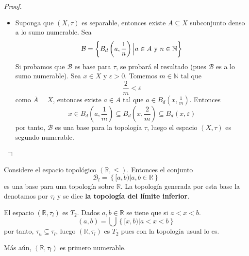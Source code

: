 \documentclass[12pt]{report}
\newcounter{it}
\theoremstyle{largebreak}
\begin{document}
\begin{proof}
\begin{itemize}
            \item Suponga que $(X,\tau)$ es separable, entonces existe $A\subseteq X$ subconjunto denso a lo sumo numerable. Sea
            \begin{equation*}
                \mathcal{B}=\left\{B_d\left(a,\frac{1}{n}\right) \Big|a\in A\textup{ y }n\in\mathbb{N} \right\}
            \end{equation*}
            Si probamos que $\mathcal{B}$ es base para $\tau$, se probará el resultado (pues $\mathcal{B}$ es a lo sumo numerable). Sea $x\in X$ y $\varepsilon>0$. Tomemos $m\in\mathbb{N}$ tal que
            \begin{equation*}
                \frac{2}{m}<\varepsilon
            \end{equation*}
            como $\overline{A}=X$, entonces existe $a\in A$ tal que $a\in B_d\left(x,\frac{1}{m}\right)$. Entonces
            \begin{equation*}
                x\in B_d\left(a,\frac{1}{m}\right)\subseteq B_d\left(x,\frac{2}{m} \right)\subseteq B_d\left(x,\varepsilon\right)
            \end{equation*}
            por tanto, $\mathcal{B}$ es una base para la topología $\tau$, luego el espacio $(X,\tau)$ es segundo numerable.
        \end{itemize}
    \end{proof}

    \begin{exa}
        Considere el espacio topológico $(\mathbb{R},\leq)$. Entonces el conjunto
        \begin{equation*}
            \mathcal{B}_l=\left\{[a,b)\Big|a,b\in\mathbb{R} \right\}
        \end{equation*}
        es una base para una topología sobre $\mathbb{R}$. La topología generada por esta base la denotamos por $\tau_l$ y se dice \textbf{la topología del límite inferior}.
    \end{exa}

    \begin{exa}
        El espacio $(\mathbb{R},\tau_l)$ es $T_2$. Dados $a,b\in\mathbb{R}$ se tiene que si $a<x<b$.
        \begin{equation*}
            (a,b)=\bigcup\left\{[x,b)\Big|a<x<b \right\}
        \end{equation*}
        por tanto, $\tau_u\subseteq\tau_l$, luego $(\mathbb{R},\tau_l)$ es $T_2$ pues con la topología usual lo es.

        Más aún, $(\mathbb{R},\tau_l)$ es primero numerable.
    \end{exa}
\end{document}
